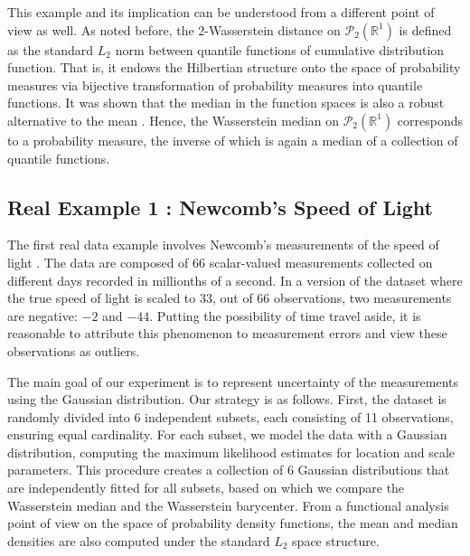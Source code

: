 \documentclass[11pt]{article}
\newcommand{\calP}{\mathcal{P}}
\newcommand{\bbR}{\mathbb{R}}
\begin{document}
This example and its implication can be understood from a different point of view as well. As noted before, the 2-Wasserstein distance on $\calP_2(\bbR^1)$ is defined as the standard $L_2$ norm between quantile functions of cumulative distribution function. That is, it endows the Hilbertian structure onto the space of probability measures via bijective transformation of probability measures into quantile functions. It was shown that the median in the function spaces is also a robust alternative to the mean \citep{minsker_2015_GeometricMedianRobust}. Hence, the Wasserstein median on $\calP_2(\bbR^1)$ corresponds to a probability measure, the inverse of which is again a median of a collection of quantile functions.

\subsection{Real Example 1 : Newcomb's Speed of Light}



The first real data example involves Newcomb's measurements of the speed of light \citep{newcomb_1891_MeasuresVelocityLight}. The data are composed of 66 scalar-valued measurements collected on different days recorded in millionths of a second. In a version of the dataset where the true speed of light is scaled to $33$, out of 66 observations, two measurements are negative: $-2$ and $-44$. Putting the possibility of time travel aside, it is reasonable to attribute this phenomenon to measurement errors and view these observations as outliers. 

The main goal of our experiment is to represent uncertainty of the measurements using the Gaussian distribution. Our strategy is as follows. First, the dataset is randomly divided into 6 independent subsets, each consisting of 11 observations, ensuring equal cardinality. For each subset, we model the data with a Gaussian distribution, computing the maximum likelihood estimates for location and scale parameters. This procedure creates a collection of 6 Gaussian distributions that are independently fitted for all subsets, based on which we compare the Wasserstein median and the Wasserstein barycenter. From a functional analysis point of view on the space of probability density functions, the mean and median densities are also computed under the standard $L_2$ space structure. 
\end{document}
